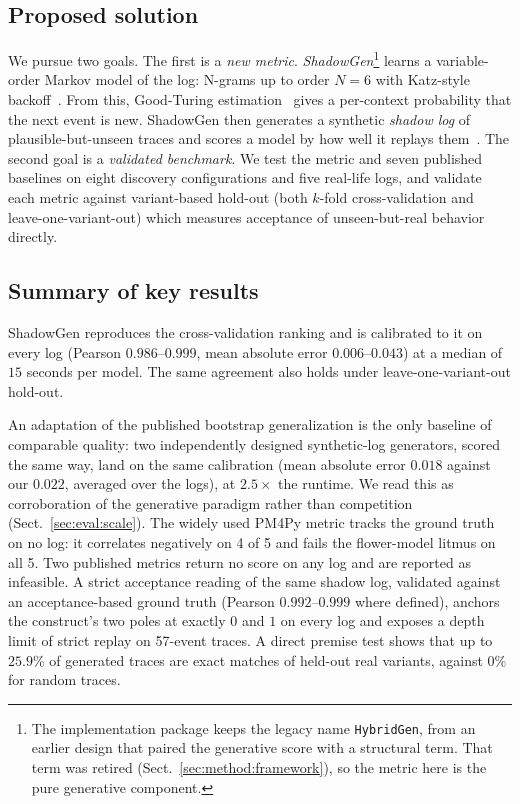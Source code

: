 \documentclass[runningheads]{llncs}
\newcommand{\chg}[1]{\textcolor{chgblue}{#1}}
\begin{document}
\subsection{Proposed solution}
We pursue two goals. The first is a \emph{new metric}. \emph{ShadowGen}\footnote{The implementation package keeps the legacy name \texttt{HybridGen}, from an earlier design that paired the generative score with a structural term. That term was retired (Sect.~\ref{sec:method:framework}), so the metric here is the pure generative component.} learns a variable-order Markov model of the log: N-grams up to order $N{=}6$ with Katz-style backoff~\cite{katz1987}. From this, Good-Turing estimation~\cite{gale1995gt} gives a per-context probability that the next event is new. ShadowGen then generates a synthetic \emph{shadow log} of plausible-but-unseen traces and scores a model by how well it replays them~\cite{rozinat2008conformance}. The second goal is a \emph{validated benchmark}. We test the metric \chg{and seven published baselines on eight discovery configurations and five real-life logs}, and validate each metric against variant-based hold-out (both $k$-fold cross-validation and leave-one-variant-out) which measures acceptance of unseen-but-real behavior directly.

\subsection{Summary of key results}
\chg{ShadowGen reproduces the cross-validation ranking and is calibrated to it on every log (Pearson $0.986$--$0.999$, mean absolute error $0.006$--$0.043$) at a median of $15$ seconds per model. The same agreement also holds under leave-one-variant-out hold-out.}

\chg{An adaptation of the published bootstrap generalization is the only baseline of comparable quality: two independently designed synthetic-log generators, scored the same way, land on the same calibration (mean absolute error $0.018$ against our $0.022$, averaged over the logs), at $2.5\times$ the runtime. We read this as corroboration of the generative paradigm rather than competition (Sect.~\ref{sec:eval:scale}). The widely used PM4Py metric tracks the ground truth on no log: it correlates negatively on 4 of 5 and fails the flower-model litmus on all 5. Two published metrics return no score on any log and are reported as infeasible. A strict acceptance reading of the same shadow log, validated against an acceptance-based ground truth (Pearson $0.992$--$0.999$ where defined), anchors the construct's two poles at exactly $0$ and $1$ on every log and exposes a depth limit of strict replay on 57-event traces. A direct premise test shows that up to $25.9\%$ of generated traces are exact matches of held-out real variants, against $0\%$ for random traces.}
\end{document}
